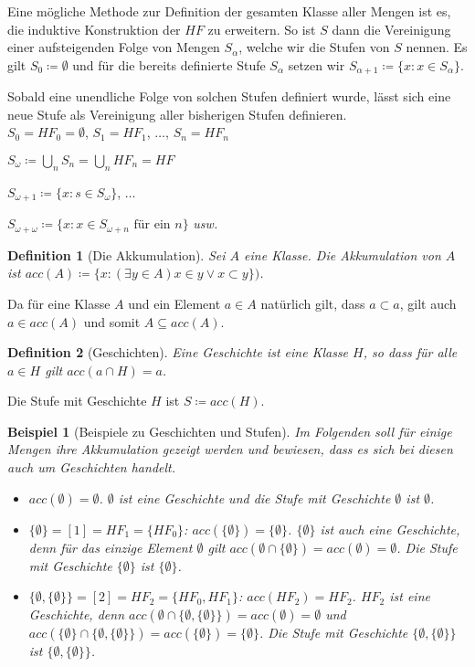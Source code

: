 \documentclass[german]{article}
\theoremstyle{break}
\newtheorem{example}{Beispiel}
\theoremstyle{def_style}
\newtheorem{definition}{Definition}
\theoremstyle{def_style}
\begin{document}
Eine mögliche Methode zur Definition der gesamten Klasse aller Mengen ist es, die induktive Konstruktion der $HF$ zu erweitern. So ist $S$ dann die Vereinigung einer aufsteigenden Folge von Mengen $S_\alpha$, welche wir die Stufen von $S$ nennen. Es gilt $S_0\coloneqq \emptyset$ und für die bereits definierte Stufe $S_\alpha$ setzen wir $S_{\alpha +1}\coloneqq\{x : x\in S_\alpha\}$.

Sobald eine unendliche Folge von solchen Stufen definiert wurde, lässt sich eine neue Stufe als Vereinigung aller bisherigen Stufen definieren.\\

$S_0=HF_0=\emptyset$, $S_1=HF_1$, $\dots$, $S_n=HF_n$

$S_\omega \coloneqq \bigcup\limits_n S_n = \bigcup\limits_n HF_n = HF$

$S_{\omega+1}\coloneqq\{x : s\in S_\omega\}$, $\dots$

$S_{\omega+\omega}\coloneqq\{x : x \in S_{\omega+n} \text{ für ein } n\}$ \textit{usw.}

\begin{definition}[Die Akkumulation]
	Sei $A$ eine Klasse. Die Akkumulation von $A$ ist $acc(A)\coloneqq\{x : (\exists y \in A) x\in y\lor x \subset y\})$.
\end{definition}

Da für eine Klasse $A$ und ein Element $a\in A$ natürlich gilt, dass $a \subset a$, gilt auch $a\in acc(A)$ und somit $A\subseteq acc(A)$.

\begin{definition}[Geschichten]
	Eine Geschichte ist eine Klasse $H$, so dass für alle $a\in H$ gilt $acc(a\cap H)=a$.
\end{definition}

Die Stufe mit Geschichte $H$ ist $S\coloneqq acc(H)$.

\begin{example}[Beispiele zu Geschichten und Stufen]
	Im Folgenden soll für einige Mengen ihre Akkumulation gezeigt werden und bewiesen, dass es sich bei diesen auch um Geschichten handelt.
	\begin{itemize}
		\item $acc(\emptyset)=\emptyset$. $\emptyset$ ist eine Geschichte und die Stufe mit Geschichte $\emptyset$ ist $\emptyset$.
		\item $\{\emptyset\} = [1] = HF_1 = \{HF_0\}$: $acc(\{\emptyset\}) = \{\emptyset\}$. 
		$\{\emptyset\}$ ist auch eine Geschichte, denn für das einzige Element $\emptyset$ gilt $acc(\emptyset \cap \{\emptyset\})=acc(\emptyset)=\emptyset$. 
		Die Stufe mit Geschichte $\{\emptyset\}$ ist $\{\emptyset\}$.
		\item $\{\emptyset, \{\emptyset\}\}=[2]=HF_2=\{HF_0, HF_1\}$: $acc(HF_2)=HF_2$.
		$HF_2$ ist eine Geschichte, denn $acc(\emptyset \cap \{\emptyset, \{\emptyset\}\})=acc(\emptyset)=\emptyset$ und $acc(\{\emptyset\}\cap \{\emptyset, \{\emptyset\}\})=acc(\{\emptyset\})=\{\emptyset\}$. Die Stufe mit Geschichte $\{\emptyset, \{\emptyset\}\}$ ist $\{\emptyset, \{\emptyset\}\}$.
	\end{itemize}
\label{GeschichtenBsp}
\end{example}
\end{document}
